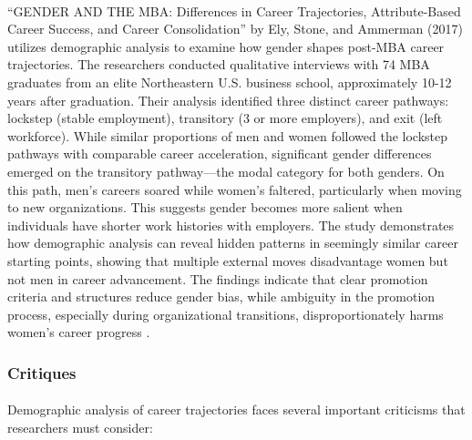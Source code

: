 \documentclass[../main.tex]{subfiles}
\begin{document}
\paragraph{} ``GENDER AND THE MBA: Differences in Career Trajectories, Attribute-Based Career Success, and Career Consolidation'' by Ely, Stone, and Ammerman (2017) utilizes demographic analysis to examine how gender shapes post-MBA career trajectories. The researchers conducted qualitative interviews with 74 MBA graduates from an elite Northeastern U.S. business school, approximately 10-12 years after graduation. Their analysis identified three distinct career pathways: lockstep (stable employment), transitory (3 or more employers), and exit (left workforce). While similar proportions of men and women followed the lockstep pathways with comparable career acceleration, significant gender differences emerged on the transitory pathway—the modal category for both genders. On this path, men's careers soared while women's faltered, particularly when moving to new organizations. This suggests gender becomes more salient when individuals have shorter work histories with employers. The study demonstrates how demographic analysis can reveal hidden patterns in seemingly similar career starting points, showing that multiple external moves disadvantage women but not men in career advancement. The findings indicate that clear promotion criteria and structures reduce gender bias, while ambiguity in the promotion process, especially during organizational transitions, disproportionately harms women's career progress \citep{ely2017gender}.

\subsubsection{Critiques}

\paragraph{} Demographic analysis of career trajectories faces several important criticisms that researchers must consider:
\end{document}
